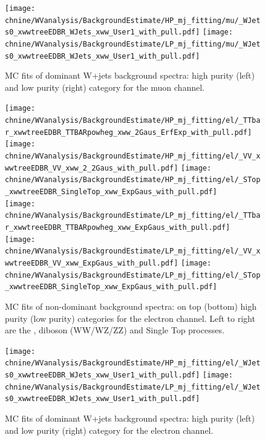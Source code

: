 \begin{figure}[htbp]
\centering
\texttt{[image: \\chnine/WVanalysis/BackgroundEstimate/HP\_mj\_fitting/mu/\_WJets0\_xwwtreeEDBR\_WJets\_xww\_User1\_with\_pull.pdf]}
\texttt{[image: \\chnine/WVanalysis/BackgroundEstimate/LP\_mj\_fitting/mu/\_WJets0\_xwwtreeEDBR\_WJets\_xww\_User1\_with\_pull.pdf]}\\
\caption{MC fits of dominant W+jets background \mJ spectra: high purity (left) and low purity (right) category for the muon channel.}
\label{fig:mcfitsjetmass_1b}
\end{figure}

\begin{figure}[htbp]
\centering
\texttt{[image: \\chnine/WVanalysis/BackgroundEstimate/HP\_mj\_fitting/el/\_TTbar\_xwwtreeEDBR\_TTBARpowheg\_xww\_2Gaus\_ErfExp\_with\_pull.pdf]}
\texttt{[image: \\chnine/WVanalysis/BackgroundEstimate/HP\_mj\_fitting/el/\_VV\_xwwtreeEDBR\_VV\_xww\_2\_2Gaus\_with\_pull.pdf]}
\texttt{[image: \\chnine/WVanalysis/BackgroundEstimate/HP\_mj\_fitting/el/\_STop\_xwwtreeEDBR\_SingleTop\_xww\_ExpGaus\_with\_pull.pdf]}\\
\texttt{[image: \\chnine/WVanalysis/BackgroundEstimate/LP\_mj\_fitting/el/\_TTbar\_xwwtreeEDBR\_TTBARpowheg\_xww\_ExpGaus\_with\_pull.pdf]}
\texttt{[image: \\chnine/WVanalysis/BackgroundEstimate/LP\_mj\_fitting/el/\_VV\_xwwtreeEDBR\_VV\_xww\_ExpGaus\_with\_pull.pdf]}
\texttt{[image: \\chnine/WVanalysis/BackgroundEstimate/LP\_mj\_fitting/el/\_STop\_xwwtreeEDBR\_SingleTop\_xww\_ExpGaus\_with\_pull.pdf]}\\
\caption{MC fits of non-dominant background \mJ spectra: on top (bottom) high purity (low purity) categories for the electron
channel. Left to right are the \ttbar, diboson (WW/WZ/ZZ) and Single Top processes.}
\label{fig:mcfitsjetmass_2}
\end{figure}

\begin{figure}[htbp]
\centering
\texttt{[image: \\chnine/WVanalysis/BackgroundEstimate/HP\_mj\_fitting/el/\_WJets0\_xwwtreeEDBR\_WJets\_xww\_User1\_with\_pull.pdf]}
\texttt{[image: \\chnine/WVanalysis/BackgroundEstimate/LP\_mj\_fitting/el/\_WJets0\_xwwtreeEDBR\_WJets\_xww\_User1\_with\_pull.pdf]}\\
\caption{MC fits of dominant W+jets background \mJ spectra: high purity (left) and low purity (right) category for the electron channel.}
\label{fig:mcfitsjetmass_2b}
\end{figure}

